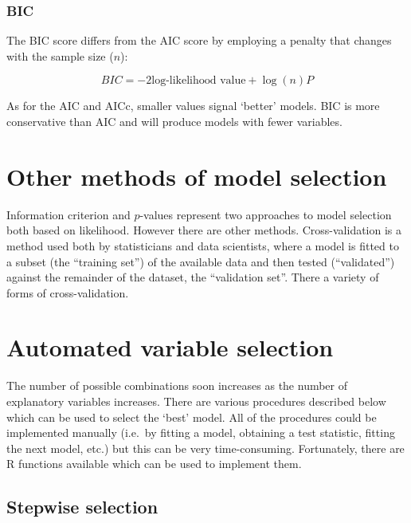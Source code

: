 \documentclass[
  oneside]{krantz}
\begin{document}
\hypertarget{bic}{%
\subsubsection{BIC}\label{bic}}

The BIC score differs from the AIC score by employing a penalty that changes with the sample size (\(n\)):

\begin{equation}
BIC=-2 \textrm{log-likelihood value}  + \log(n)P
\end{equation}

As for the AIC and AICc, smaller values signal `better' models. BIC is more conservative than AIC and will produce models with fewer variables.

\hypertarget{other-methods-of-model-selection}{%
\section{Other methods of model selection}\label{other-methods-of-model-selection}}

Information criterion and \(p\)-values represent two approaches to model selection both based on likelihood. However there are other methods. Cross-validation is a method used both by statisticians and data scientists, where a model is fitted to a subset (the ``training set'') of the available data and then tested (``validated'') against the remainder of the dataset, the ``validation set''. There a variety of forms of cross-validation.

\hypertarget{automated-variable-selection}{%
\section{Automated variable selection}\label{automated-variable-selection}}

The number of possible combinations soon increases as the number of explanatory variables increases. There are various procedures described below which can be used to select the `best' model. All of the procedures could be implemented manually (i.e.~by fitting a model, obtaining a test statistic, fitting the next model, etc.) but this can be very time-consuming. Fortunately, there are R functions available which can be used to implement them.

\hypertarget{stepwise-selection}{%
\subsection{Stepwise selection}\label{stepwise-selection}}
\end{document}
